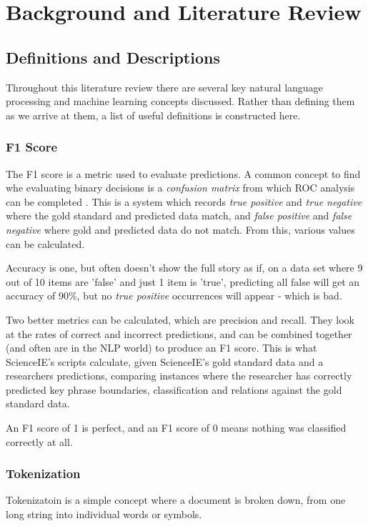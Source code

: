 \chapter{Background and Literature Review}

\section{Definitions and Descriptions}
Throughout this literature review there are several key natural language processing and machine learning concepts discussed. Rather than defining them as we arrive at them, a list of useful definitions is constructed here.

\subsection*{F1 Score}
The F1 score is a metric used to evaluate predictions. A common concept to find whe evaluating binary decisions is a \textit{confusion matrix} from which ROC analysis can be completed \cite{Fawcett2006}. This is a system which records \textit{true positive} and \textit{true negative} where the gold standard and predicted data match, and \textit{false positive} and \textit{false negative} where gold and predicted data do not match. From this, various values can be calculated. 

Accuracy is one, but often doesn't show the full story as if, on a data set where 9 out of 10 items are 'false' and just 1 item is 'true', predicting all false will get an accuracy of 90\%, but no \textit{true positive} occurrences will appear - which is bad. 

Two better metrics can be calculated, which are precision and recall. They look at the rates of correct and incorrect predictions, and can be combined together (and often are in the NLP world) to produce an F1 score. This is what ScienceIE's scripts calculate, given ScienceIE's gold standard data and a researchers predictions, comparing instances where the researcher has correctly predicted key phrase boundaries, classification and relations against the gold standard data.

An F1 score of 1 is perfect, and an F1 score of 0 means nothing was classified correctly at all.

\subsection*{Tokenization}
Tokenizatoin is a simple concept where a document is broken down, from one long string into individual words or symbols. 

